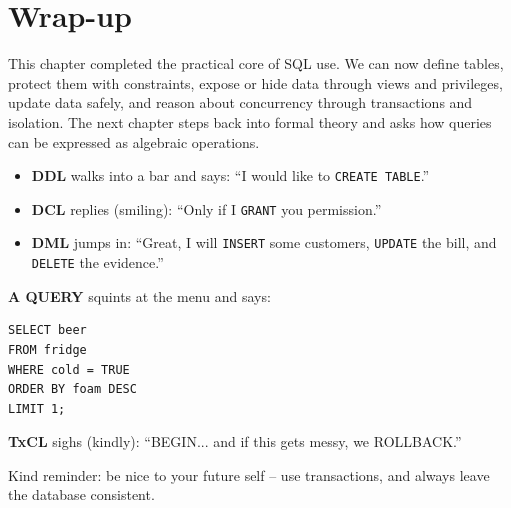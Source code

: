 \documentclass[11pt,a4paper,openany]{book}
\begin{document}
\section{Wrap-up}
This chapter completed the practical core of SQL use. We can now define tables, protect them with constraints, expose or hide data through views and privileges, update data safely, and reason about concurrency through transactions and isolation. The next chapter steps back into formal theory and asks how queries can be expressed as algebraic operations.

\begin{jokebox}
\small

\begin{itemize}
  \item \textbf{DDL} walks into a bar and says: ``I would like to \texttt{CREATE TABLE}.''
  \item \textbf{DCL} replies (smiling): ``Only if I \texttt{GRANT} you permission.''
  \item \textbf{DML} jumps in: ``Great, I will \texttt{INSERT} some customers, \texttt{UPDATE} the bill, and \texttt{DELETE} the evidence.''
\end{itemize}

\vspace{2mm}
\textbf{A QUERY} squints at the menu and says:
\begin{lstlisting}[style=sqlstyle,basicstyle=\scriptsize\ttfamily]
SELECT beer
FROM fridge
WHERE cold = TRUE
ORDER BY foam DESC
LIMIT 1;
\end{lstlisting}

\vspace{1mm}
\textbf{TxCL} sighs (kindly): ``BEGIN... and if this gets messy, we ROLLBACK.''

\vspace{1mm}
\footnotesize
Kind reminder: be nice to your future self -- use transactions, and always leave the database consistent.
\end{jokebox}
\end{document}
